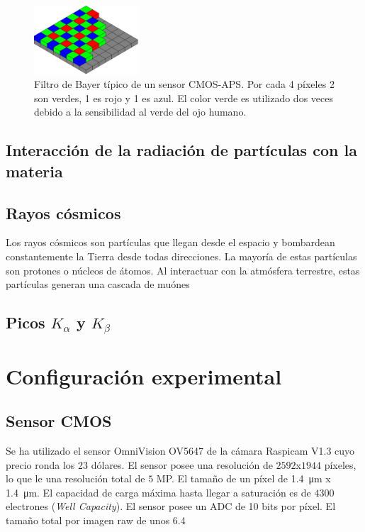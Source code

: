 \documentclass[twoside,twocolumn]{article}
\begin{document}
      \begin{figure}[h]
        \includegraphics[width=0.35\textwidth]{figures/Bayer_pattern.png}
        \caption{Filtro de Bayer típico de un sensor CMOS-APS. Por cada 4 píxeles 2 son verdes, 1 es rojo y 1 es azul.
          El color verde es utilizado dos veces debido a la sensibilidad al verde del ojo humano.}
        \label{fig:bayer}
      \end{figure}

    \subsection{Interacción de la radiación de partículas con la materia}
      

    \subsection{Rayos cósmicos}
      Los rayos cósmicos son partículas que llegan desde el espacio y bombardean constantemente la Tierra desde todas direcciones.
      La mayoría de estas partículas son protones o núcleos de átomos.
      Al interactuar con la atmósfera terrestre, estas partículas generan una cascada de muónes %


    \subsection{Picos $K_{\alpha}$ y $K_{\beta}$}

  \section{Configuración experimental}\label{sec:conf_exp}

    \subsection{Sensor CMOS}\label{sec:conf_exp:CMOS}
      Se ha utilizado el sensor OmniVision OV5647 de la cámara Raspicam V1.3 cuyo precio ronda los 23 dólares.
      El sensor posee una resolución de	$2592$x$1944$ píxeles, lo que le una resolución total de $5$ MP.
      El tamaño de un píxel de \SI{1.4}{\micro\meter} x \SI{1.4}{\micro\meter}.
      El capacidad de carga máxima hasta llegar a saturación es de $4300$ electrones (\emph{Well Capacity}).
      El sensor posee un ADC de 10 bits por píxel.
      El tamaño total por imagen raw de unos \SI{6.4}{\mega\byte}
\end{document}
